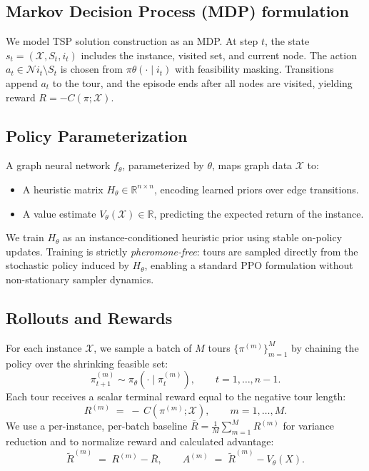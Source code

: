 \documentclass[a4paper,conference]{IEEEtran}
\newcommand{\RR}{\mathbb{R}}
\begin{document}
\subsection{Markov Decision Process (MDP) formulation}
We model TSP solution construction as an MDP. At step $t$, the state $s_t=(\mathcal{X}, S_t, i_t)$ includes the instance, visited set, and current node. The action $a_t\in \mathcal{N}{i_t}\setminus S_t$ is chosen from $\pi\theta(\cdot\mid i_t)$ with feasibility masking. Transitions append $a_t$ to the tour, and the episode ends after all nodes are visited, yielding reward $R=-C(\pi;\mathcal{X})$.

\subsection{Policy Parameterization}
A graph neural network $f_{\theta}$, parameterized by $\theta$, maps graph data $\mathcal{X}$ to:
\begin{itemize}
\item A heuristic matrix $H_\theta \in \RR^{n \times n}$, encoding learned priors over edge transitions.
\item A value estimate $V_\theta(\mathcal{X}) \in \RR$, predicting the expected return of the instance.
\end{itemize}

We train $H_\theta$ as an instance-conditioned heuristic prior using stable on-policy updates. Training is strictly \emph{pheromone-free}: tours are sampled directly from the stochastic policy induced by $H_\theta$, enabling a standard PPO formulation without non-stationary sampler dynamics.
\subsection{Rollouts and Rewards}
For each instance $\mathcal{X}$, we sample a batch of $M$ tours
$\{\pi^{(m)}\}_{m=1}^{M}$ by chaining the policy over the shrinking feasible set:
\[
\pi^{(m)}_{t+1} \sim \pi_\theta(\cdot \mid \pi^{(m)}_t), 
\qquad t=1,\dots,n-1.
\]
Each tour receives a scalar terminal reward equal to the negative tour length:
\begin{equation}
R^{(m)} \;=\; -\, C(\pi^{(m)};\mathcal{X}), 
\qquad m=1,\dots,M.
\end{equation}
We use a per-instance, per-batch baseline $\bar R = \frac{1}{M}\sum_{m=1}^M R^{(m)}$ for variance reduction and to normalize reward and calculated advantage:
\begin{equation}
\tilde R^{(m)} \;=\; R^{(m)} - \bar R, 
\qquad
A^{(m)} \;=\; \tilde R^{(m)} - V_\theta(X).
\end{equation}
\end{document}
